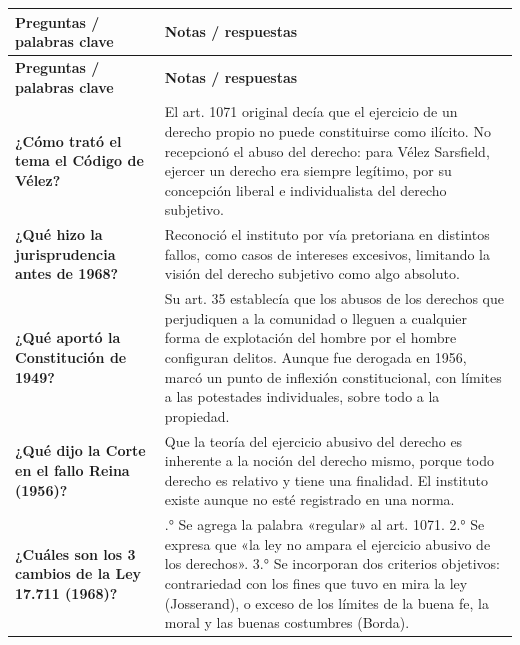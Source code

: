 \documentclass[12pt,oneside]{book}
\begin{document}
\begin{longtable}{
    >{\raggedright\arraybackslash}p{}
    >{\raggedright\arraybackslash}p{}
}
\toprule
\textbf{Preguntas / palabras clave} & \textbf{Notas / respuestas} \\
\midrule
\endfirsthead
\toprule
\textbf{Preguntas / palabras clave} & \textbf{Notas / respuestas} \\
\midrule
\endhead
\bottomrule
\endfoot

\textbf{¿Cómo trató el tema el Código de Vélez?} &
El art. 1071 original decía que el ejercicio de un derecho propio no puede constituirse como ilícito. No recepcionó el abuso del derecho: para Vélez Sarsfield, ejercer un derecho era siempre legítimo, por su concepción liberal e individualista del derecho subjetivo. \\[0.8em]

\textbf{¿Qué hizo la jurisprudencia antes de 1968?} &
Reconoció el instituto por vía pretoriana en distintos fallos, como casos de intereses excesivos, limitando la visión del derecho subjetivo como algo absoluto. \\[0.8em]

\textbf{¿Qué aportó la Constitución de 1949?} &
Su art. 35 establecía que los abusos de los derechos que perjudiquen a la comunidad o lleguen a cualquier forma de explotación del hombre por el hombre configuran delitos. Aunque fue derogada en 1956, marcó un punto de inflexión constitucional, con límites a las potestades individuales, sobre todo a la propiedad. \\[0.8em]

\textbf{¿Qué dijo la Corte en el fallo Reina (1956)?} &
Que la teoría del ejercicio abusivo del derecho es inherente a la noción del derecho mismo, porque todo derecho es relativo y tiene una finalidad. El instituto existe aunque no esté registrado en una norma. \\[0.8em]

\textbf{¿Cuáles son los 3 cambios de la Ley 17.711 (1968)?} &
1.° Se agrega la palabra «regular» al art. 1071. 2.° Se expresa que «la ley no ampara el ejercicio abusivo de los derechos». 3.° Se incorporan dos criterios objetivos: contrariedad con los fines que tuvo en mira la ley (Josserand), o exceso de los límites de la buena fe, la moral y las buenas costumbres (Borda). \\[0.8em]


\end{longtable}
\end{document}
